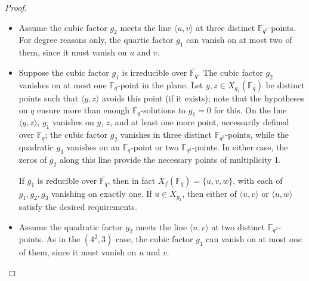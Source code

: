 \documentclass[10pt,a4paper]{amsart}
\newcommand{\F}{\mathbb{F}}
\newcommand{\Span}[1]{\langle #1 \rangle}
\begin{document}
\begin{proof}
\begin{itemize}
        \item[$(4^2,3)$] Assume the cubic factor $g_2$ meets the line $\Span{u,v}$ at three distinct $\F_{q^3}$-points. For degree reasons only, the quartic factor $g_1$ can vanish on at most two of them, since it must vanish on $u$ and $v$.
        
        \item[$(3^2,3,2)$] Suppose the cubic factor $g_1$ is irreducible over $\overline{\F_q}$. The cubic factor $g_2$ vanishes on at most one $\F_q$-point in the plane. Let $y,z \in X_{g_1}(\F_q)$ be distinct points such that $\Span{y,z}$ avoids this point (if it exists); note that the hypotheses on $q$ ensure more than enough $\F_q$-solutions to $g_1=0$ for this. On the line $\Span{y,z}$, $g_1$ vanishes on $y$, $z$, and at least one more point, necessarily defined over $\F_q$; the cubic factor $g_2$ vanishes in three distinct $\F_{q^3}$-points, while the quadratic $g_3$ vanishes on an $\F_q$-point or two $\F_{q^2}$-points. In either case, the zeros of $g_2$ along this line provide the necessary points of multiplicity 1. 

        If $g_1$ is reducible over $\overline{\F_q}$, then in fact $X_f(\F_q) = \{u,v,w\}$, with each of $g_1, g_2, g_3$ vanishing on exactly one. If $u \in X_{g_1}$, then either of $\Span{u,v}$ or $\Span{u,w}$ satisfy the desired requirements.

        \item[$(3^3,2)$] Assume the quadratic factor $g_2$ meets the line $\Span{u,v}$ at two distinct $\F_{q^2}$-points. As in the $(4^2,3)$ case, the cubic factor $g_1$ can vanish on at most one of them, since it must vanish on $u$ and $v$.
\end{itemize}\vspace{-1ex}
\end{proof}
\end{document}
